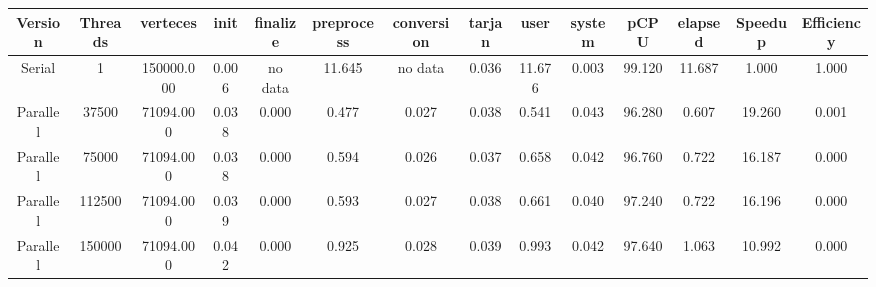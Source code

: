 \begin{tabular}{|c|c|c|c|c|c|c|c|c|c|c|c|c|c|}
\toprule
 Version &  Threads &   verteces &  init & finalize &  preprocess & conversion &  tarjan &   user &  system &   pCPU &  elapsed &  Speedup &  Efficiency \\
\midrule
  Serial &        1 & 150000.000 & 0.006 &  no data &      11.645 &    no data &   0.036 & 11.676 &   0.003 & 99.120 &   11.687 &    1.000 &       1.000 \\
Parallel &    37500 &  71094.000 & 0.038 &    0.000 &       0.477 &      0.027 &   0.038 &  0.541 &   0.043 & 96.280 &    0.607 &   19.260 &       0.001 \\
Parallel &    75000 &  71094.000 & 0.038 &    0.000 &       0.594 &      0.026 &   0.037 &  0.658 &   0.042 & 96.760 &    0.722 &   16.187 &       0.000 \\
Parallel &   112500 &  71094.000 & 0.039 &    0.000 &       0.593 &      0.027 &   0.038 &  0.661 &   0.040 & 97.240 &    0.722 &   16.196 &       0.000 \\
Parallel &   150000 &  71094.000 & 0.042 &    0.000 &       0.925 &      0.028 &   0.039 &  0.993 &   0.042 & 97.640 &    1.063 &   10.992 &       0.000 \\
\bottomrule
\end{tabular}
